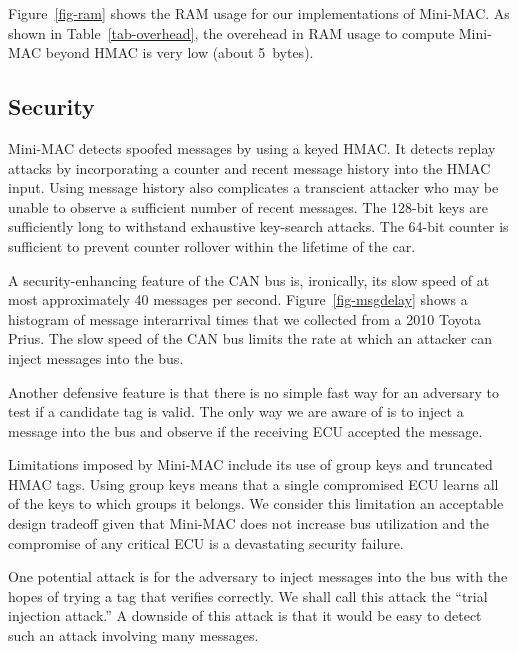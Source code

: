 Figure~\ref{fig-ram} shows the RAM usage for our implementations of Mini-MAC.
As shown in Table~\ref{tab-overhead}, the overehead in RAM usage to compute Mini-MAC
beyond HMAC is very low (about 5~bytes).



	
\subsection{Security}
\label{security}

Mini-MAC detects spoofed messages by using a keyed HMAC.  It detects replay attacks
by incorporating a counter and recent message history into the HMAC input.  Using message
history also complicates a transcient attacker who may be unable to observe a sufficient
number of recent messages.  The 128-bit keys are sufficiently long to withstand 
exhaustive key-search attacks.  The 64-bit counter is sufficient to prevent counter
rollover within the lifetime of the car.

A security-enhancing feature of the CAN bus is, ironically, its slow speed of at most
approximately 40 messages per second.  Figure~\ref{fig-msgdelay} shows a histogram of
message interarrival times that we collected from a 2010 Toyota Prius.
The slow speed of the CAN bus limits the rate at which an attacker can
inject messages into the bus.

Another defensive feature is that there is no simple fast way for an adversary to
test if a candidate tag is valid.   The only way we are aware of is to inject a message into the bus
and observe if the receiving ECU accepted the message.

Limitations imposed by Mini-MAC include its use of group keys and truncated HMAC tags.  
Using group keys means that a single compromised ECU learns all of the keys
to which groups it belongs.  We consider this limitation an acceptable design tradeoff
given that Mini-MAC does not increase bus utilization and the compromise of any critical
ECU is a devastating security failure.

One potential attack is for the adversary to inject messages into the bus with the hopes
of trying a tag that verifies correctly.  We shall call this attack the ``trial injection attack.''
A downside of this attack is that it would be easy to detect such an attack involving
many messages.

